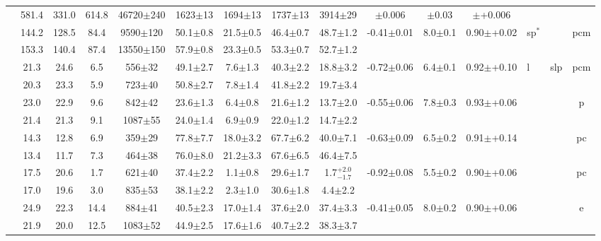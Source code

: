 \documentclass[iop,revtex4]{emulateapj}
\newcommand\M{\rule{0pt}{2.3ex}}
\newcommand\U{\rule{0pt}{3.2ex}}       %
\begin{document}
\begin{landscape}
{\begin{longtable}{ccccccccccccp{0.25in}p{0.25in}c}
\M&581.4&331.0&614.8&46720$\pm$240&1623$\pm$13&1694$\pm$13&1737$\pm$13&3914$\pm$29&$\pm$0.006&$\pm$0.03&$\pm$+0.006&&&\\
\U\multirow{2}{*}{3}&144.2&128.5&84.4&9590$\pm$120&50.1$\pm$0.8&21.5$\pm$0.5&46.4$\pm$0.7&48.7$\pm$1.2&\multirow{2}{*}{-0.41$\pm$0.01}&\multirow{2}{*}{8.0$\pm$0.1}&\multirow{2}{*}{0.90$\pm$+0.02}&\multirow{2}{*}{sp$^*$}&\multirow{2}{*}{}&\multirow{2}{*}{pcm}\\
\M&153.3&140.4&87.4&13550$\pm$150&57.9$\pm$0.8&23.3$\pm$0.5&53.3$\pm$0.7&52.7$\pm$1.2&&&&&&\\
\U\multirow{2}{*}{4}&21.3&24.6&6.5&556$\pm$32&49.1$\pm$2.7&7.6$\pm$1.3&40.3$\pm$2.2&18.8$\pm$3.2&\multirow{2}{*}{-0.72$\pm$0.06}&\multirow{2}{*}{6.4$\pm$0.1}&\multirow{2}{*}{0.92$\pm$+0.10}&\multirow{2}{*}{l}&\multirow{2}{*}{slp}&\multirow{2}{*}{pcm}\\
\M&20.3&23.3&5.9&723$\pm$40&50.8$\pm$2.7&7.8$\pm$1.4&41.8$\pm$2.2&19.7$\pm$3.4&&&&&&\\
\U\multirow{2}{*}{5}&23.0&22.9&9.6&842$\pm$42&23.6$\pm$1.3&6.4$\pm$0.8&21.6$\pm$1.2&13.7$\pm$2.0&\multirow{2}{*}{-0.55$\pm$0.06}&\multirow{2}{*}{7.8$\pm$0.3}&\multirow{2}{*}{0.93$\pm$+0.06}&\multirow{2}{*}{}&\multirow{2}{*}{}&\multirow{2}{*}{p}\\
\M&21.4&21.3&9.1&1087$\pm$55&24.0$\pm$1.4&6.9$\pm$0.9&22.0$\pm$1.2&14.7$\pm$2.2&&&&&&\\
\U\multirow{2}{*}{6}&14.3&12.8&6.9&359$\pm$29&77.8$\pm$7.7&18.0$\pm$3.2&67.7$\pm$6.2&40.0$\pm$7.1&\multirow{2}{*}{-0.63$\pm$0.09}&\multirow{2}{*}{6.5$\pm$0.2}&\multirow{2}{*}{0.91$\pm$+0.14}&\multirow{2}{*}{}&\multirow{2}{*}{}&\multirow{2}{*}{pc}\\
\M&13.4&11.7&7.3&464$\pm$38&76.0$\pm$8.0&21.2$\pm$3.3&67.6$\pm$6.5&46.4$\pm$7.5&&&&&&\\
\U\multirow{2}{*}{7}&17.5&20.6&1.7&621$\pm$40&37.4$\pm$2.2&1.1$\pm$0.8&29.6$\pm$1.7&1.7$^{+2.0}_{-1.7}$&\multirow{2}{*}{-0.92$\pm$0.08}&\multirow{2}{*}{5.5$\pm$0.2}&\multirow{2}{*}{0.90$\pm$+0.06}&\multirow{2}{*}{}&\multirow{2}{*}{}&\multirow{2}{*}{pc}\\
\M&17.0&19.6&3.0&835$\pm$53&38.1$\pm$2.2&2.3$\pm$1.0&30.6$\pm$1.8&4.4$\pm$2.2&&&&&&\\
\U\multirow{2}{*}{8}&24.9&22.3&14.4&884$\pm$41&40.5$\pm$2.3&17.0$\pm$1.4&37.6$\pm$2.0&37.4$\pm$3.3&\multirow{2}{*}{-0.41$\pm$0.05}&\multirow{2}{*}{8.0$\pm$0.2}&\multirow{2}{*}{0.90$\pm$+0.06}&\multirow{2}{*}{}&\multirow{2}{*}{}&\multirow{2}{*}{e}\\
\M&21.9&20.0&12.5&1083$\pm$52&44.9$\pm$2.5&17.6$\pm$1.6&40.7$\pm$2.2&38.3$\pm$3.7&&&&&&\\

\end{longtable}}
\end{landscape}
\end{document}
